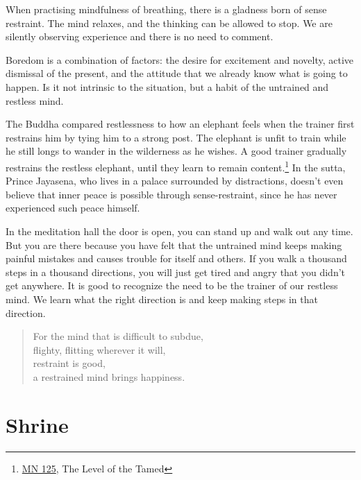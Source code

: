 When practising mindfulness of breathing, there is a gladness born of
sense restraint. The mind relaxes, and the thinking can be allowed to
stop. We are silently observing experience and there is no need to
comment.

Boredom is a combination of factors: the desire for excitement and
novelty, active dismissal of the present, and the attitude that we
already know what is going to happen. Is it not intrinsic to the
situation, but a habit of the untrained and restless mind.

The Buddha compared restlessness to how an elephant feels when the
trainer first restrains him by tying him to a strong post. The elephant
is unfit to train while he still longs to wander in the wilderness as he
wishes. A good trainer gradually restrains the restless elephant, until
they learn to remain content.\footnote{\href{https://suttacentral.net/mn125}{MN
  125}, The Level of the Tamed} In the sutta, Prince Jayasena, who lives
in a palace surrounded by distractions, doesn't even believe that inner
peace is possible through sense-restraint, since he has never
experienced such peace himself.

\enlargethispage*{\baselineskip}

In the meditation hall the door is open, you can stand up and walk out
any time. But you are there because you have felt that the untrained
mind keeps making painful mistakes and causes trouble for itself and
others. If you walk a thousand steps in a thousand directions, you will
just get tired and angry that you didn't get anywhere. It is good to
recognize the need to be the trainer of our restless mind. We learn what
the right direction is and keep making steps in that direction.

\begin{quote}
For the mind that is difficult to subdue,\\
flighty, flitting wherever it will,\\
restraint is good,\\
a restrained mind brings happiness.

\bigskip

\end{quote}

\section{Shrine}


